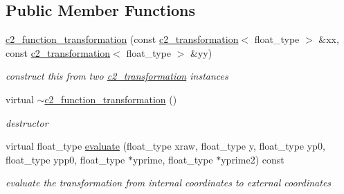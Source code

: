 \subsection*{Public Member Functions}
\begin{DoxyCompactItemize}
\item 
\hyperlink{classc2__function__transformation_a26fa71708edcb8b669b34daea6e9ea79}{c2\-\_\-function\-\_\-transformation} (const \hyperlink{classc2__transformation}{c2\-\_\-transformation}$<$ float\-\_\-type $>$ \&xx, const \hyperlink{classc2__transformation}{c2\-\_\-transformation}$<$ float\-\_\-type $>$ \&yy)
\begin{DoxyCompactList}\small\item\em construct this from two \hyperlink{classc2__transformation}{c2\-\_\-transformation} instances \end{DoxyCompactList}\item 
\hypertarget{classc2__function__transformation_ab7cd7a2df0c12d4ce25f2e8a415383ad}{virtual \hyperlink{classc2__function__transformation_ab7cd7a2df0c12d4ce25f2e8a415383ad}{$\sim$c2\-\_\-function\-\_\-transformation} ()}\label{classc2__function__transformation_ab7cd7a2df0c12d4ce25f2e8a415383ad}

\begin{DoxyCompactList}\small\item\em destructor \end{DoxyCompactList}\item 
virtual float\-\_\-type \hyperlink{classc2__function__transformation_a7089747852a044a4a6a9884fadecf871}{evaluate} (float\-\_\-type xraw, float\-\_\-type y, float\-\_\-type yp0, float\-\_\-type ypp0, float\-\_\-type $\ast$yprime, float\-\_\-type $\ast$yprime2) const 
\begin{DoxyCompactList}\small\item\em evaluate the transformation from internal coordinates to external coordinates \end{DoxyCompactList}\end{DoxyCompactItemize}
